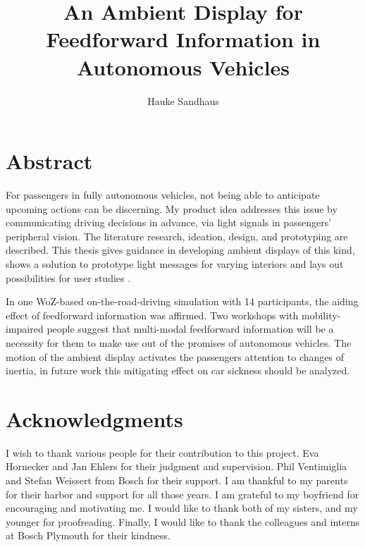 \documentclass[oneside]{tutthesis} %
\author{Hauke Sandhaus}
\title{An Ambient Display for Feedforward Information in Autonomous Vehicles}
\begin{document}



\chapter*{Abstract}
\label{ch:abstract}
For passengers in fully autonomous vehicles, not being able to anticipate upcoming actions can be discerning. My product idea addresses this issue by communicating driving decisions in advance, via light signals in passengers' peripheral vision. 
The literature research, ideation, design, and prototyping are described. This thesis gives guidance in developing ambient displays of this kind, shows a solution to prototype light messages for varying interiors and lays out possibilities for user studies . 

In one WoZ-based on-the-road-driving simulation with 14 participants, the aiding effect of feedforward information was affirmed. Two workshops with mobility-impaired people suggest that multi-modal feedforward information will be a necessity for them to make use out of the promises of autonomous vehicles. The motion of the ambient display activates the passengers attention to changes of inertia, in future work this mitigating effect on car sickness should be analyzed. 





\chapter*{Acknowledgments}
\label{ch:Acknowledgments}
I wish to thank various people for their contribution to this project. Eva Hornecker and Jan Ehlers for their judgment and supervision. Phil Ventimiglia and Stefan Weissert from Bosch for their support. I am thankful to my parents for their harbor and support for all those years. I am grateful to my boyfriend for encouraging and motivating me. I would like to thank both of my sisters, and my younger for proofreading. Finally, I would like to thank the colleagues and interns at Bosch Plymouth for their kindness. 
\end{document}
